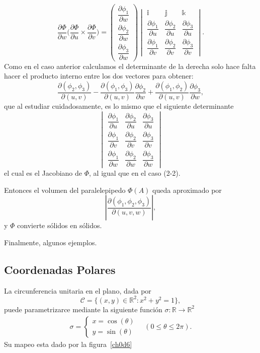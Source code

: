 \documentclass[mid,fleqn,draft,twoside]{notasdeclase}
\renewcommand{\t}{\times}
\newcommand{\pdd}[2]{\dfrac{\partial #1}{\partial #2}}
\newcommand{\R}{\mathbb{R}}
\newcommand{\ihat}{\mathbb i}
\newcommand{\jhat}{\mathbb j}
\newcommand{\khat}{\mathbb k}
\begin{document}
\[  	\pdd{\Phi}{w} \bigg(\pdd{\Phi}{u}\t\pdd{\Phi}{v}\bigg) = \begin{pmatrix}
\pdd{\phi_1}{w} \\[.8em] \pdd{\phi_2}{w} \\[.8em] \pdd{\phi_3}{w}
\end{pmatrix}
\begin{vmatrix}
\ihat& \jhat& \khat \\[.3em]
\pdd{\phi_1}{u}& \pdd{\phi_2}{u}& \pdd{\phi_3}{u} \\[.8em]
\pdd{\phi_1}{v}& \pdd{\phi_2}{v}& \pdd{\phi_3}{v}
\end{vmatrix}. \]
 Como en el caso anterior calculamos el determinante de la derecha solo hace falta hacer el producto interno entre los dos vectores para obtener:
 \[ \pdd{(\phi_2,\phi_3)}{(u,v)} - \pdd{(\phi_1,\phi_3)}{(u,v)}\pdd{\phi_2}{w} + \pdd{(\phi_1,\phi_2)}{(u,v)}\pdd{\phi_3}{w}, \]
 que al estudiar cuidadosamente, es lo mismo que el siguiente determinante
 \[ \begin{vmatrix}
 \pdd{\phi_1}{u}& \pdd{\phi_2}{u}& \pdd{\phi_3}{u} \\[.8em]
 \pdd{\phi_1}{v}& \pdd{\phi_2}{v}& \pdd{\phi_3}{v} \\[.8em]
 \pdd{\phi_1}{w}& \pdd{\phi_2}{w}& \pdd{\phi_3}{w}
 \end{vmatrix} \]
 el cual es el Jacobiano de $\Phi$, al igual que en el caso (2-2).
 
 Entonces el volumen del paralelepipedo $\Phi(A)$ queda aproximado por
 \[ \left\lvert \pdd{(\phi_1,\phi_2,\phi_3)}{(u,v,w)} \right\rvert, \]
 y $\Phi$ convierte sólidos en sólidos.
 
  Finalmente, algunos ejemplos.
 
 \subsection{Coordenadas Polares}
 
 \begin{ejem}[caso 1-2]
 	La circunferencia unitaria en el plano, dada por
 	\[ \mathcal{C} = \{ (x,y)\in\R^2:x^2+y^2=1 \}, \]
 	puede parametrizarce mediante la siguiente función $\sigma:\R\to\R^2$
 	\begin{align}\label{polcoord}
 		\sigma= \begin{cases}
 		x = \cos(\theta) \\
 		y = \sin (\theta)
 		\end{cases}\quad (0\leq\theta\leq2\pi).
 	\end{align}
 	Su mapeo esta dado por la figura~\ref{ch0d6}
%		
 	
 \end{ejem}
\end{document}
